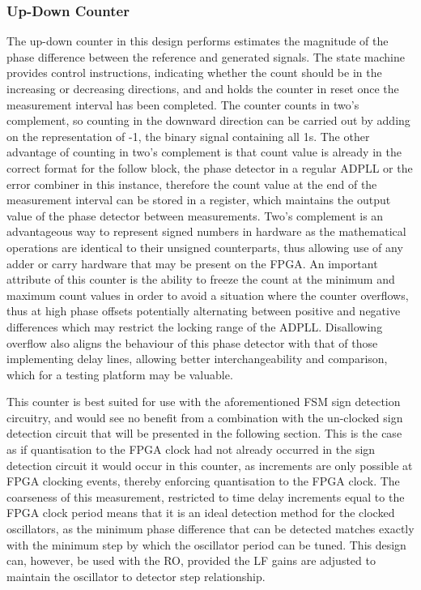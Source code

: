 \subsubsection{Up-Down Counter}
The up-down counter in this design performs estimates the magnitude of the phase difference between the reference and generated signals. The state machine provides control instructions, indicating whether the count should be in the increasing or decreasing directions, and and holds the counter in reset once the measurement interval has been completed. The counter counts in two's complement, so counting in the downward direction can be carried out by adding on the representation of -1, the binary signal containing all 1s. The other advantage of counting in two's complement is that count value is already in the correct format for the follow block, the phase detector in a regular \ac{ADPLL} or the error combiner in this instance, therefore the count value at the end of the measurement interval can be stored in a register, which maintains the output value of the phase detector between measurements. Two's complement is an advantageous way to represent signed numbers in hardware as the mathematical operations are identical to their unsigned counterparts, thus allowing use of any adder or carry hardware that may be present on the \ac{FPGA}. An important attribute of this counter is the ability to freeze the count at the minimum and maximum count values in order to avoid a situation where the counter overflows, thus at high phase offsets potentially alternating between positive and negative differences which may restrict the locking range of the \ac{ADPLL}. Disallowing overflow also aligns the behaviour of this phase detector with that of those implementing delay lines, allowing better interchangeability and comparison, which for a testing platform may be valuable.

This counter is best suited for use with the aforementioned \ac{FSM} sign detection circuitry, and would see no benefit from a combination with the un-clocked sign detection circuit that will be presented in the following section. This is the case as if quantisation to the \ac{FPGA} clock had not already occurred in the sign detection circuit it would occur in this counter, as increments are only possible at \ac{FPGA} clocking events, thereby enforcing quantisation to the \ac{FPGA} clock. The coarseness of this measurement, restricted to time delay increments equal to the \ac{FPGA} clock period means that it is an ideal detection method for the clocked oscillators, as the minimum phase difference that can be detected matches exactly with the minimum step by which the oscillator period can be tuned. This design can, however, be used with the \acl{RO}, provided the \acl{LF} gains are adjusted to maintain the oscillator to detector step relationship.

